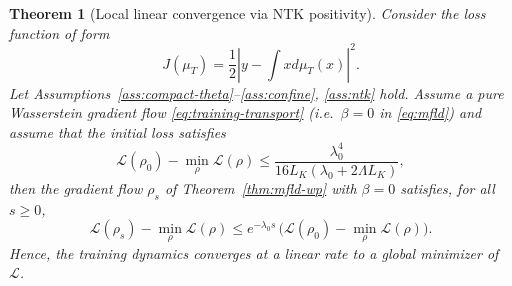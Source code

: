 \documentclass[10pt,a4paper]{amsart}
\newtheorem{theorem}{Theorem}
\begin{document}
\begin{theorem}[Local linear convergence via NTK positivity]
\label{thm:ntk-conv} Consider the loss function of form 
$$
J(\mu_T)=\frac{1}{2} \left|y- \int x d\mu_T(x) \right|^2. 
$$
Let Assumptions~\ref{ass:compact-theta}--\ref{ass:confine}, \ref{ass:ntk} hold. Assume a pure Wasserstein gradient flow \eqref{eq:training-transport} (i.e.\ $\beta=0$ in \eqref{eq:mfld}) and assume that  the initial loss satisfies
\begin{equation}\label{ini}
\mathcal L(\rho_0) - \min_\rho \mathcal L(\rho) \le \frac{ \lambda_0^4}{16  L_K (\lambda_0+2\Lambda L_K)},
\end{equation}
then the gradient flow $\rho_s$ of Theorem~\ref{thm:mfld-wp} with $\beta=0$ satisfies, for all $s\ge0$,
\begin{equation}
\mathcal L(\rho_s) - \min_\rho\mathcal L(\rho) \le e^{-\lambda_0 s}\,\big(\mathcal L(\rho_0)-\min_\rho\mathcal L(\rho)\big).
\end{equation}
Hence, the training dynamics converges at a linear rate to a global minimizer of $\mathcal L$.
\end{theorem}
\end{document}
